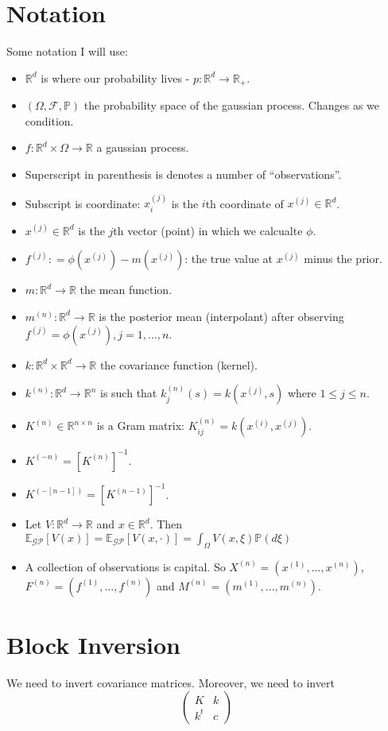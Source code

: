 \documentclass[paper=a4, fontsize=11pt]{scrartcl} %
\numberwithin{equation}{section} %
\numberwithin{figure}{section} %
\numberwithin{table}{section} %
\newcommand{\rr}{\mathbb{R}}
\newcommand{\egp}{\mathbb{E}_{\mathcal{GP}}}
\newcommand{\xn}{x^{(n)}} %
\newcommand{\xj}{x^{(j)}}
\newcommand{\xii}{x^{(i)}}
\newcommand{\Xn}{X^{(n)}}
\newcommand{\mn}{m^{(n)}}
\newcommand{\Mn}{M^{(n)}}
\newcommand{\fn}{f^{(n)}} %
\newcommand{\fj}{f^{(j)}}
\newcommand{\Fn}{F^{(n)}}
\newcommand{\kn}{k^{(n)}}
\newcommand{\Kinvn}{K^{(-n)}} %
\newcommand{\Kinvnm}{K^{(-[n-1])}}
\begin{document}
\section{Notation}
Some notation I will use:
\begin{itemize}
 \item $\rr^d$ is where our probability lives - $p :\rr^d \to \rr_{+}$.
 \item $(\Omega, \mathcal{F}, \mathbb{P})$ the probability space of the gaussian process. Changes as we condition.
 \item $f : \rr^d \times \Omega \to \rr$ a gaussian process. 
 \item Superscript in parenthesis is denotes a number of ``observations''. 
 \item Subscript is coordinate: $\xj_i$ is the $i$th coordinate of $\xj \in \rr^d$.
 \item $\xj \in \rr^d$ is the $j$th vector (point) in which we calcualte $\phi$.
 \item $\fj : = \phi ( \xj ) - m(\xj)$: the true value at $\xj$ minus the prior.
 \item $m: \rr ^d \to \rr$ the mean function. 
 \item $\mn: \rr^d \to \rr$ is the posterior mean (interpolant) after observing $\fj = \phi (\xj) , j=1,...,n$.
 \item $k: \rr ^d \times \rr ^d \to \rr$ the covariance function (kernel).
 \item $\kn: \rr^d \to \rr^n$ is such that $\kn_j(s) = k(\xj , s)$ where $1 \leq j \leq n$. 
 \item $K^{(n)} \in \rr^{ n\times n} $ is a Gram matrix: $K^{(n)}_{ij} = k(\xii , \xj)$.
 \item $\Kinvn = [K^{(n)}]^{-1}$.
 \item $\Kinvnm = [K^{(n-1)}]^{-1}$.
 \item Let $V: \rr^d \to \rr$ and $x \in \rr^d$. Then $\egp[ V(x) ]=\egp [V(x, \cdot)] =  \int_{\Omega} V(x, \xi) \mathbb{P}(d\xi) $
 \item A collection of observations is capital. So $\Xn = ( x^{(1)} , ... , \xn )$, $\Fn = (f^{(1)} ,..., \fn)$  and $ \Mn = (m^{(1)} , ..., \mn)$.
\end{itemize}




\section{Block Inversion}
We need to invert covariance matrices. Moreover, we need to invert
$$ \left( \begin{array}{cc}
K   & k \\
k^t & c \end{array} \right)
$$
\end{document}
